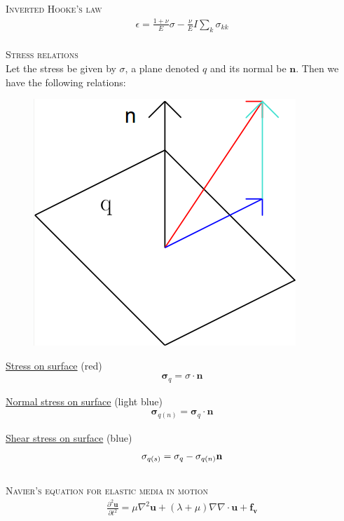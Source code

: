 \documentclass[11pt,a4paper,english]{article}
\begin{document}
{\scshape Inverted Hooke's law} \\
\begin{align*}
\epsilon = \frac{1+\nu}{E}\sigma - \frac{\nu}{E}I \sum_k \sigma_{kk}
\end{align*}
\\[2ex]

{\scshape Stress relations} \\

\noindent
Let the stress be given by $\sigma$, a plane denoted $q$ and its normal be $\mathbf{n}$. Then we have the following relations:
\begin{figure}[h!]
\centering
\includegraphics[scale=0.3]{figures/stressplane.png}
\end{figure}

\underline{Stress on surface} (red)
\begin{align*}
\mathbf{\sigma}_q =\sigma \cdot \mathbf{n}
\end{align*}

\underline{Normal stress on surface} (light blue)
\begin{align*}
\mathbf{\sigma}_{q(n)} =\mathbf{\sigma}_q \cdot \mathbf{n}
\end{align*}

\underline{Shear stress on surface} (blue)
\begin{align*}
\boldmath{\sigma}_{q(s)} =\mathbf{\sigma}_q -\mathbf{\sigma}_{q(n)} \mathbf{n}
\end{align*}
\\[2ex]

{\scshape Navier's equation for elastic media in motion} \\
\begin{align*}
\frac{\partial^2 \mathbf{u}}{\partial t^2} = \mu \nabla^2 \mathbf{u} + (\lambda + \mu) \nabla \nabla \cdot \mathbf{u} + \mathbf{f_v}
\end{align*}
\end{document}
